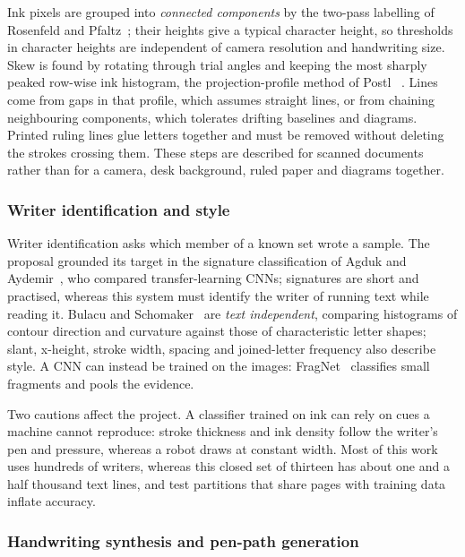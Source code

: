 Ink pixels are grouped into \emph{connected components} by the two-pass labelling of Rosenfeld and Pfaltz~\cite{rosenfeld1966}; their heights give a typical character height, so thresholds in character heights are independent of camera resolution and handwriting size. Skew is found by rotating through trial angles and keeping the most sharply peaked row-wise ink histogram, the projection-profile method of Postl~\cite{postl1986} . Lines come from gaps in that profile, which assumes straight lines, or from chaining neighbouring components, which tolerates drifting baselines and diagrams. Printed ruling lines glue letters together and must be removed without deleting the strokes crossing them. These steps are described for scanned documents rather than for a camera, desk background, ruled paper and diagrams together.

\subsubsection{Writer identification and style}
\label{sec:lit-writer}

Writer identification asks which member of a known set wrote a sample. The proposal grounded its target in the signature classification of Agduk and Aydemir~\cite{agduk2022}, who compared transfer-learning CNNs; signatures are short and practised, whereas this system must identify the writer of running text while reading it. Bulacu and Schomaker~\cite{bulacu2007} are \emph{text independent}, comparing histograms of contour direction and curvature against those of characteristic letter shapes; slant, x-height, stroke width, spacing and joined-letter frequency also describe style. A CNN can instead be trained on the images: FragNet~\cite{he2020} classifies small fragments and pools the evidence.

Two cautions affect the project. A classifier trained on ink can rely on cues a machine cannot reproduce: stroke thickness and ink density follow the writer's pen and pressure, whereas a robot draws at constant width. Most of this work uses hundreds of writers, whereas this closed set of thirteen has about one and a half thousand text lines, and test partitions that share pages with training data inflate accuracy.

\subsubsection{Handwriting synthesis and pen-path generation}
\label{sec:lit-synth}

